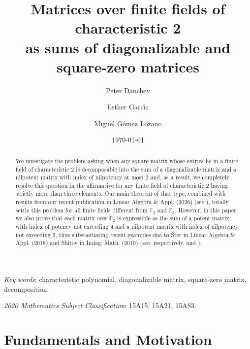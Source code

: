 \documentclass{amsart}
\date\today
\author[P. Danchev]{Peter Danchev}
\author[E. Garc\'\i a]{Esther Garc\'\i a}
\author[M. G\'omez Lozano]{Miguel G\'omez Lozano}
\def\FF{\mathbb{F}}
\theoremstyle{definition}
\theoremstyle{remark}
\numberwithin{equation}{section}
\begin{document}
\title[Matrices over finite fields of characteristic 2 ...]{Matrices over finite fields of characteristic 2 \\ as sums of diagonalizable and square-zero matrices}

\maketitle

\begin{abstract} We investigate the problem asking when any square matrix whose entries lie in a finite field of characteristic 2 is decomposable into the sum of a diagonalizable matrix and a nilpotent matrix with index of nilpotency at most 2 and, as a result, we completely resolve this question in the affirmative for any finite field of characteristic 2 having strictly more than three elements. Our main theorem of that type, combined with results from our recent publication in Linear Algebra \& Appl. (2026) (see \cite{DGL4}), totally settle this problem for all finite fields different from  $\FF_2$ and $\FF_3$. However, in this paper we also prove that each matrix over $\FF_2$ is expressible as the sum of a potent matrix with index of potency not exceeding 4 and a nilpotent matrix with index of nilpotency not exceeding 2, thus substantiating recent examples due to \v{S}ter in Linear Algebra \& Appl. (2018) and Shitov in Indag. Math. (2019) (see, respectively, \cite{St1} and \cite{Sh}).
\end{abstract}


\bigskip

{\footnotesize \textit{Key words}: characteristic polynomial, diagonalizable matrix, square-zero matrix, decomposition.}

{\footnotesize \textit{2020 Mathematics Subject Classification}: 15A15, 15A21, 15A83.}


\section{Fundamentals and Motivation}
\end{document}
